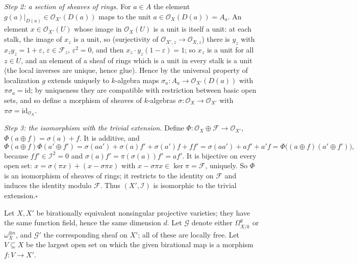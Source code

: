 \documentclass[11pt]{article}
\begin{document}
\emph{Step 2: a section of sheaves of rings.} For $a\in A$ the element $g(a)|_{D(a)}\in\mathcal O_{X'}(D(a))$ maps to the unit $a\in\mathcal O_X(D(a))=A_a$. An element $x\in\mathcal O_{X'}(U)$ whose image in $\mathcal O_X(U)$ is a unit is itself a unit: at each stalk, the image of $x_z$ is a unit, so (surjectivity of $\mathcal O_{X',z}\to\mathcal O_{X,z}$) there is $y_z$ with $x_zy_z=1+\varepsilon$, $\varepsilon\in\mathcal F_z$, $\varepsilon^2=0$, and then $x_z\cdot y_z(1-\varepsilon)=1$; so $x_z$ is a unit for all $z\in U$, and an element of a sheaf of rings which is a unit in every stalk is a unit (the local inverses are unique, hence glue). Hence by the universal property of localization $g$ extends uniquely to $k$-algebra maps $\sigma_a:A_a\to\mathcal O_{X'}(D(a))$ with $\pi\sigma_a=\mathrm{id}$; by uniqueness they are compatible with restriction between basic open sets, and so define a morphism of sheaves of $k$-algebras $\sigma:\mathcal O_X\to\mathcal O_{X'}$ with $\pi\sigma=\mathrm{id}_{\mathcal O_X}$.

\emph{Step 3: the isomorphism with the trivial extension.} Define $\Phi:\mathcal O_X\oplus\mathcal F\to\mathcal O_{X'}$, $\Phi(a\oplus f)=\sigma(a)+f$. It is additive, and
\[\Phi(a\oplus f)\Phi(a'\oplus f')=\sigma(aa')+\sigma(a)f'+\sigma(a')f+ff'=\sigma(aa')+af'+a'f=\Phi\big((a\oplus f)(a'\oplus f')\big),\]
because $ff'\in\mathcal I^2=0$ and $\sigma(a)f'=\pi(\sigma(a))f'=af'$. It is bijective on every open set: $x=\sigma(\pi x)+(x-\sigma\pi x)$ with $x-\sigma\pi x\in\ker\pi=\mathcal F$, uniquely. So $\Phi$ is an isomorphism of sheaves of rings; it restricts to the identity on $\mathcal F$ and induces the identity modulo $\mathcal F$. Thus $(X',\mathcal I)$ is isomorphic to the trivial extension.\hfill$\square$

\pf
Let $X,X'$ be birationally equivalent nonsingular projective varieties; they have the same function field, hence the same dimension $d$. Let $\mathcal G$ denote either $\Omega^q_{X/k}$ or $\omega_X^{\otimes n}$, and $\mathcal G'$ the corresponding sheaf on $X'$; all of these are locally free. Let $V\subseteq X$ be the largest open set on which the given birational map is a morphism $f:V\to X'$.
\end{document}
